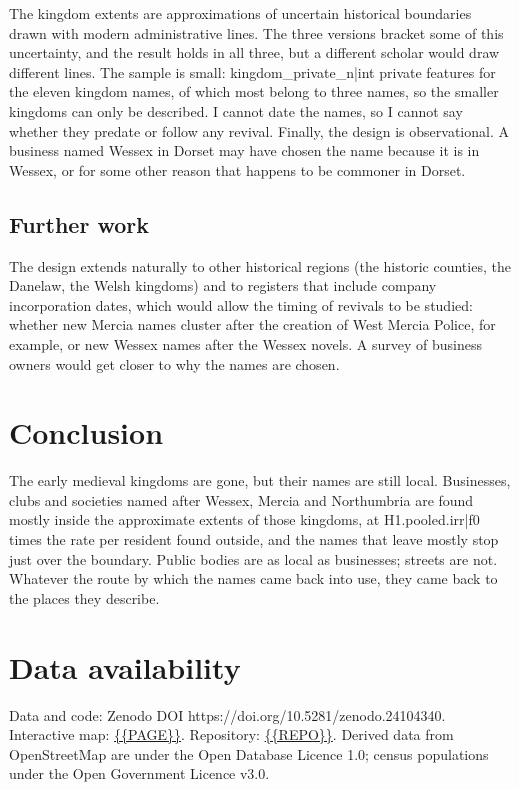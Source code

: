 \documentclass[11pt,a4paper]{article}
\begin{document}
The kingdom extents are approximations of uncertain historical boundaries drawn with modern administrative lines. The three versions bracket some of this uncertainty, and the result holds in all three, but a different scholar would draw different lines. The sample is small: {{kingdom_private_n|int}} private features for the eleven kingdom names, of which most belong to three names, so the smaller kingdoms can only be described. I cannot date the names, so I cannot say whether they predate or follow any revival. Finally, the design is observational. A business named Wessex in Dorset may have chosen the name because it is in Wessex, or for some other reason that happens to be commoner in Dorset.

\subsection{Further work}
The design extends naturally to other historical regions (the historic counties, the Danelaw, the Welsh kingdoms) and to registers that include company incorporation dates, which would allow the timing of revivals to be studied: whether new Mercia names cluster after the creation of West Mercia Police, for example, or new Wessex names after the Wessex novels. A survey of business owners would get closer to why the names are chosen.

\section{Conclusion}\label{sec:conc}
The early medieval kingdoms are gone, but their names are still local. Businesses, clubs and societies named after Wessex, Mercia and Northumbria are found mostly inside the approximate extents of those kingdoms, at {{H1.pooled.irr|f0}} times the rate per resident found outside, and the names that leave mostly stop just over the boundary. Public bodies are as local as businesses; streets are not. Whatever the route by which the names came back into use, they came back to the places they describe.

\section*{Data availability}
Data and code: Zenodo DOI https://doi.org/10.5281/zenodo.24104340. Interactive map: \url{{{PAGE}}}. Repository: \url{{{REPO}}}. Derived data from OpenStreetMap are under the Open Database Licence 1.0; census populations under the Open Government Licence v3.0.
\end{document}
